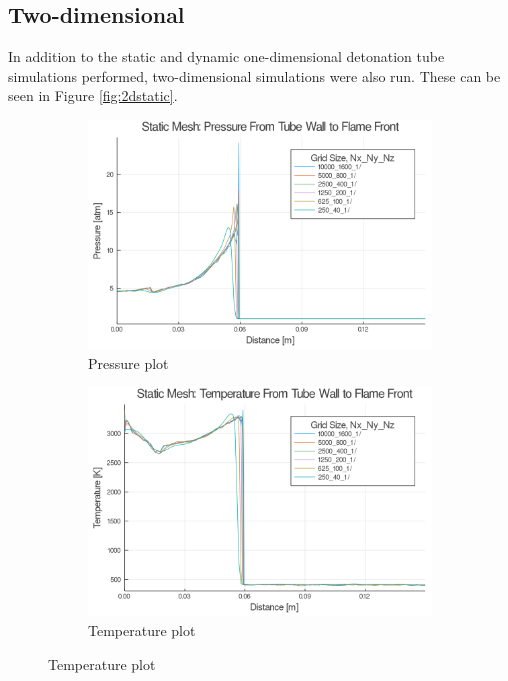 \subsection{Two-dimensional}
In addition to the static and dynamic one-dimensional detonation tube simulations performed, two-dimensional simulations were also run. These can be seen in Figure \ref{fig:2dstatic}. 
\begin{figure}[]
    \centering
    \begin{subfigure}[]{\textwidth}
        \centering
        \includegraphics[width=\textwidth]{./figs/static2d/p.png}
        \caption{Pressure plot}
    \end{subfigure}

    \begin{subfigure}[]{\textwidth}
        \centering
        \includegraphics[width=\textwidth]{./figs/static2d/t.png}
        \caption{Temperature plot}
    \end{subfigure}

\end{figure}
